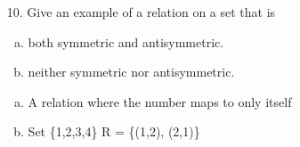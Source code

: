 \begin{itemize}
\begin{enumerate}[a.]
          \end{enumerate}
    \item[10.] Give an example of a relation on a set that is
          \begin{enumerate}[a.]
              \item both symmetric and antisymmetric.
              \item neither symmetric nor antisymmetric.
          \end{enumerate}
          \answer
          \begin{enumerate}[a.]
              \item A relation where the number maps to only itself
              \item Set \{1,2,3,4\} R = \{(1,2), (2,1)\}
          \end{enumerate}
\end{itemize}



